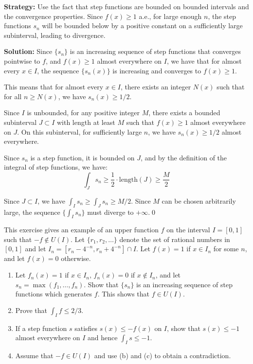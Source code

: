 \noindent\textbf{Strategy:} Use the fact that step functions are bounded on bounded intervals and the convergence properties. Since $f(x) \geq 1$ a.e., for large enough $n$, the step functions $s_n$ will be bounded below by a positive constant on a sufficiently large subinterval, leading to divergence.

\bigskip\noindent\textbf{Solution:}
Since $\{s_n\}$ is an increasing sequence of step functions that converges pointwise to $f$, and $f(x) \geq 1$ almost everywhere on $I$, we have that for almost every $x \in I$, the sequence $\{s_n(x)\}$ is increasing and converges to $f(x) \geq 1$.

This means that for almost every $x \in I$, there exists an integer $N(x)$ such that for all $n \geq N(x)$, we have $s_n(x) \geq 1/2$.

Since $I$ is unbounded, for any positive integer $M$, there exists a bounded subinterval $J \subset I$ with length at least $M$ such that $f(x) \geq 1$ almost everywhere on $J$. On this subinterval, for sufficiently large $n$, we have $s_n(x) \geq 1/2$ almost everywhere.

Since $s_n$ is a step function, it is bounded on $J$, and by the definition of the integral of step functions, we have:
\[\int_J s_n \geq \frac{1}{2} \cdot \text{length}(J) \geq \frac{M}{2}\]

Since $J \subset I$, we have $\int_I s_n \geq \int_J s_n \geq M/2$. Since $M$ can be chosen arbitrarily large, the sequence $\{\int_I s_n\}$ must diverge to $+\infty$.\qed


\begin{problembox}
\begin{problemstatement}
This exercise gives an example of an upper function $f$ on the interval $I = [0, 1]$ such that $-f \notin U(I)$. Let $\{r_1, r_2, \ldots\}$ denote the set of rational numbers in $[0, 1]$ and let $I_n = [r_n - 4^{-n}, r_n + 4^{-n}] \cap I$. Let $f(x) = 1$ if $x \in I_n$ for some $n$, and let $f(x) = 0$ otherwise.
\begin{enumerate}[label=(\alph*)]
\item Let $f_n(x) = 1$ if $x \in I_n$, $f_n(x) = 0$ if $x \notin I_n$, and let $s_n = \max(f_1, \ldots, f_n)$. Show that $\{s_n\}$ is an increasing sequence of step functions which generates $f$. This shows that $f \in U(I)$.
\item Prove that $\int_I f \leq 2/3$.
\item If a step function $s$ satisfies $s(x) \leq -f(x)$ on $I$, show that $s(x) \leq -1$ almost everywhere on $I$ and hence $\int_I s \leq -1$.
\item Assume that $-f \in U(I)$ and use (b) and (c) to obtain a contradiction.
\end{enumerate}
\end{problemstatement}
\end{problembox}

